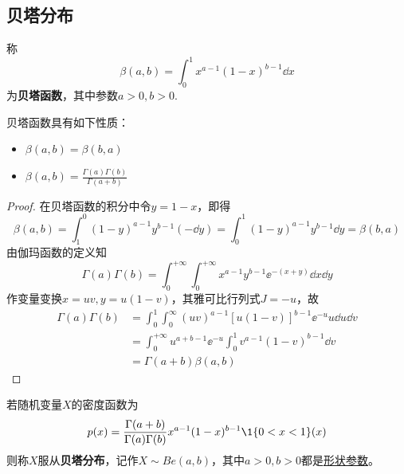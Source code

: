 \begin{proposition}
\end{proposition}

\subsection{贝塔分布}

\begin{definition}
    称
    \[ \beta(a,b) = \int_0^1 x^{a-1}(1-x)^{b-1}\dd x \]
    为\textbf{贝塔函数}，其中参数$a>0,b>0$.
\end{definition}

\begin{proposition}
    贝塔函数具有如下性质：
    \begin{itemize}
        \item $\beta(a,b)=\beta(b,a)$
        \item $\beta(a,b) = \frac{\Gamma(a)\Gamma(b)}{\Gamma(a+b)}$
    \end{itemize}
\end{proposition}
\begin{proof}
    在贝塔函数的积分中令$y=1-x$，即得
    \[ \beta(a,b) = \int_1^0(1-y)^{a-1}y^{b-1}(-\dd y) = \int_0^1 (1-y)^{a-1}y^{b-1}\dd y = \beta(b,a) \]
    由伽玛函数的定义知
    \[ \Gamma(a) \Gamma(b) = \int_0^{+\infty}\int_0^{+\infty}x^{a-1}y^{b-1}  \ee^{-(x+y)} \dd x \dd y \]
    作变量变换$x=uv,y=u(1-v)$，其雅可比行列式$J=-u$，故
    \begin{align*}
        \Gamma(a)\Gamma(b) & = \int_0^1 \int_0^{\infty} (uv)^{a-1}[u(1-v)]^{b-1}\ee^{-u}u \dd u \dd v \\
                           & = \int_0^{+\infty}u^{a+b-1}\ee^{-u} \int_0^1v^{a-1}(1-v)^{b-1}\dd v      \\
                           & = \Gamma(a+b)\beta(a,b)
    \end{align*}
\end{proof}

\begin{definition}
    若随机变量$X$的密度函数为
    \[ p(x) = \frac{\Gamma(a+b)}{\Gamma(a)\Gamma(b)}            x^{a-1}(1-x)^{b-1}\1{\{0< x < 1 \}}(x) \]
    则称$X$服从\textbf{贝塔分布}，记作$X\sim Be(a,b)$，其中$a>0,b>0$都是\underline{形状参数}。
\end{definition}


